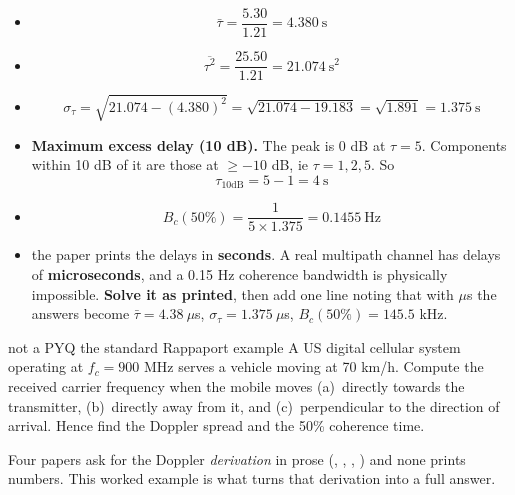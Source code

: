 \begin{itemize}
  \item \[ \bar{\tau} = \frac{5.30}{1.21} = \boxed{4.380\ \text{s}} \]
  \item \[ \overline{\tau^2} = \frac{25.50}{1.21} = 21.074\ \text{s}^2 \]
  \item \[ \sigma_\tau = \sqrt{21.074 - (4.380)^2} = \sqrt{21.074 - 19.183}
           = \sqrt{1.891} = \boxed{1.375\ \text{s}} \]
  \item \textbf{Maximum excess delay (10 dB).} The peak is 0 dB at $\tau = 5$. Components within
        10 dB of it are those at $\ge -10$ dB, ie $\tau = 1, 2, 5$. So
        \[ \tau_{10\text{dB}} = 5 - 1 = \boxed{4\ \text{s}} \]
  \item \[ B_c(50\%) = \frac{1}{5 \times 1.375} = \boxed{0.1455\ \text{Hz}} \]
  \item {} the paper prints the delays in \textbf{seconds}. A real
        multipath channel has delays of \textbf{microseconds}, and a 0.15 Hz coherence bandwidth
        is physically impossible. \textbf{Solve it as printed}, then add one line noting that
        with $\mu$s the answers become
        $\bar{\tau} = 4.38\ \mu$s, $\sigma_\tau = 1.375\ \mu$s, $B_c(50\%) = 145.5$ kHz.
\end{itemize}

\hr

{\color{sub}\footnotesize {} }

\begin{asked}[PROBLEM]{not a PYQ \textperiodcentered{} the standard Rappaport example \added}
A US digital cellular system operating at $f_c = 900$ MHz serves a vehicle moving at 70 km/h.
Compute the received carrier frequency when the mobile moves (a)~directly towards the
transmitter, (b)~directly away from it, and (c)~perpendicular to the direction of arrival.
Hence find the Doppler spread and the 50\% coherence time.
\end{asked}
{\color{sub}\footnotesize Four papers ask for the Doppler \emph{derivation} in prose
(, , , ) and none prints numbers. This worked
example is what turns that derivation into a full answer. \added}


